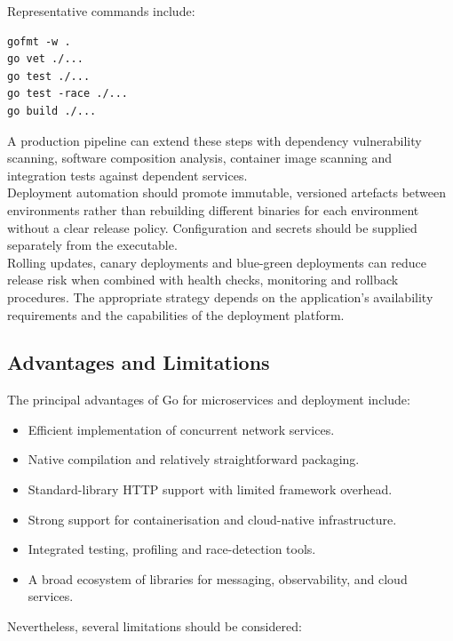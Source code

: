Representative commands include:

\begin{lstlisting}
gofmt -w .
go vet ./...
go test ./...
go test -race ./...
go build ./...
\end{lstlisting}

A production pipeline can extend these steps with dependency vulnerability scanning, software composition analysis, container image scanning and integration tests against dependent services.\\

Deployment automation should promote immutable, versioned artefacts between environments rather than rebuilding different binaries for each environment without a clear release policy. Configuration and secrets should be supplied separately from the executable.\\

Rolling updates, canary deployments and blue-green deployments can reduce release risk when combined with health checks, monitoring and rollback procedures. The appropriate strategy depends on the application's availability requirements and the capabilities of the deployment platform.

\subsection{Advantages and Limitations}

The principal advantages of Go for microservices and deployment include:

\begin{itemize}
    \item Efficient implementation of concurrent network services.
    \item Native compilation and relatively straightforward packaging.
    \item Standard-library HTTP support with limited framework overhead.
    \item Strong support for containerisation and cloud-native infrastructure.
    \item Integrated testing, profiling and race-detection tools.
    \item A broad ecosystem of libraries for messaging, observability, and cloud services.
\end{itemize}

Nevertheless, several limitations should be considered:

